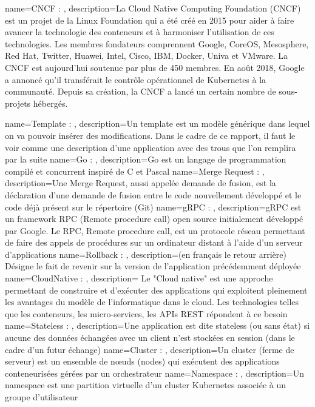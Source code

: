 {
    name=CNCF : ,
    description={La Cloud Native Computing Foundation (CNCF) est un projet de la Linux Foundation qui a été créé en 2015 pour aider à faire avancer la technologie des conteneurs  et à harmoniser l'utilisation de ces technologies.  Les membres fondateurs comprennent Google, CoreOS, Mesosphere, Red Hat, Twitter, Huawei, Intel, Cisco, IBM, Docker, Univa et VMware. La CNCF est aujourd'hui soutenue par plus de 450 membres. En août 2018, Google a annoncé qu'il transférait le contrôle opérationnel de Kubernetes à la communauté. Depuis sa création, la CNCF a lancé un certain nombre de sous-projets hébergés.}

}
{
    name=Template : ,
    description={Un template est un modèle générique dans lequel on va pouvoir insérer des modifications. Dans le cadre de ce rapport, il faut le voir comme une description d'une application avec des trous que l'on remplira par la suite}
}
{
    name=Go : ,
    description={Go est un langage de programmation compilé et concurrent inspiré de C et Pascal}
}
{
    name=Merge Request : ,
    description={Une Merge Request, aussi appelée demande de fusion, est la déclaration d'une demande de fusion entre le code nouvellement développé et le code déjà présent sur le répertoire (Git)}
}
{
    name=gRPC : ,
    description={gRPC est un framework RPC (Remote procedure call) open source initialement développé par Google. Le RPC, Remote procedure call, est un protocole réseau permettant de faire des appels de procédures sur un ordinateur distant à l’aide d’un serveur d’applications}
}
{
    name=Rollback : ,
    description={(en français le retour arrière) Désigne le fait de revenir sur la version de l'application précédemment déployée}
}
{
    name=CloudNative : ,
    description={ Le "Cloud native" est une approche permettant de construire et d'exécuter des applications qui exploitent pleinement les avantages du modèle de l'informatique dans le cloud. Les technologies telles que les conteneurs, les micro-services, les APIs REST répondent à ce besoin}
}
{
    name=Stateless : ,
    description={Une application est dite stateless (ou sans état) si aucune des données échangées avec un client n'est stockées en session (dans le cadre d'un futur échange)}
}
{
    name=Cluster : ,
    description={Un cluster  (ferme de serveur) est un ensemble de nœuds (nodes) qui exécutent des applications conteneurisées gérées par un orchestrateur}
}
{
    name=Namespace : ,
    description={Un namespace est une partition virtuelle d'un cluster Kubernetes associée à un groupe d'utilisateur}
}


